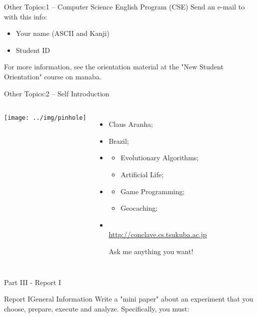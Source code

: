\documentclass[aspectratio=169]{beamer}
\begin{document}
\begin{CJK}{UTF8}{ipxm}
\begin{frame}{Other Topics:}{1 -- Computer Science English Program (CSE)}
  Send an e-mail to  with this info:
  \begin{itemize}
    \item Your name (ASCII and Kanji)
    \item Student ID
  \end{itemize}\bigskip


  For more information, see the orientation material at the "New Student Orientation" course on manaba.
\end{frame}

\begin{frame}{Other Topics:}{2 -- Self Introduction}
  \begin{columns}
    \texttt{[image: ../img/pinhole]}
    {\small
    \begin{itemize}
      \item {} Claus Aranha;
      \item {} Brazil;
      \item {}
      \begin{itemize}
        \item Evolutionary Algorithms;
        \item Artificial Life;
      \end{itemize}
      \item {}
      \begin{itemize}
        \item Game Programming;
        \item Geocaching;
      \end{itemize}
        \smallskip

      \item {}\\
      {\smaller \url{http://conclave.cs.tsukuba.ac.jp}}
      \medskip

      Ask me anything you want!
    \end{itemize}
    }
  \end{columns}
\end{frame}

\begin{frame}{}
  \begin{center}
    Part III - Report I
  \end{center}
\end{frame}

\begin{frame}{Report I}{General Information}
  Write a "mini paper" about an experiment that you choose, prepare, execute and analyze. Specifically, you must:\medskip


\end{frame}
\end{CJK}
\end{document}

